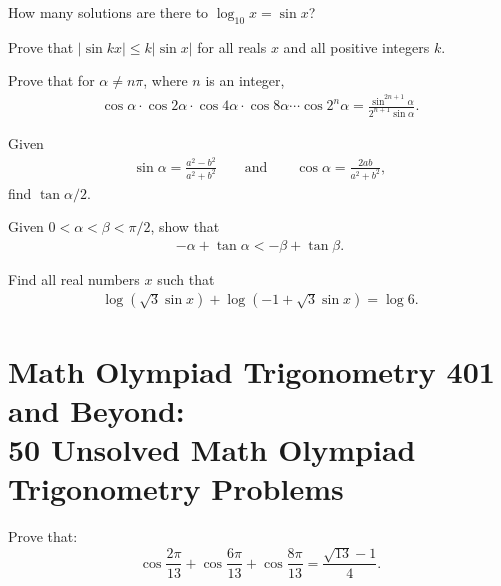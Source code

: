 \begin{question}
    How many solutions are there to $\log_{10} x = \sin x$?
\end{question}

\begin{question}
    Prove that $|\sin kx| \leq k | \sin x|$ for all reals $x$ and all positive integers $k$.
\end{question}

\begin{question}
    Prove that for $\alpha \neq n\pi$, where $n$ is an integer,
    \begin{align*}
        \cos \alpha \cdot \cos 2\alpha \cdot \cos 4\alpha \cdot \cos 8\alpha \cdots \cos 2^n\alpha = \frac{\sin^{2n+1}\alpha}{2^{n+1}\sin \alpha}.
    \end{align*}
\end{question}

\begin{question}
    Given
    \begin{align*}
        \sin \alpha = \frac{a^2 - b^2}{a^2 + b^2} \qquad \text{and} \qquad \cos \alpha = \frac{2ab}{a^2+b^2},
    \end{align*}
    find $\tan \alpha/2$.
\end{question}



\begin{question}
    Given $0<\alpha<\beta<\pi/2$, show that
    \begin{align*}
        -\alpha + \tan \alpha < -\beta + \tan \beta.
    \end{align*}
\end{question}



\begin{question}
    Find all real numbers $x$ such that
    \begin{align*}
        \log(\sqrt 3 \sin x) + \log(-1+\sqrt 3 \sin x) = \log 6.
    \end{align*}
\end{question}

\newpage
\section{Math Olympiad Trigonometry 401 and Beyond:\\ 50 Unsolved Math Olympiad Trigonometry Problems}

\begin{question} Prove that:
\[\cos\frac{2\pi}{13}+\cos\frac{6\pi}{13}+\cos\frac{8\pi}{13}=\frac{\sqrt{13}-1}{4}.\]
\end{question}



